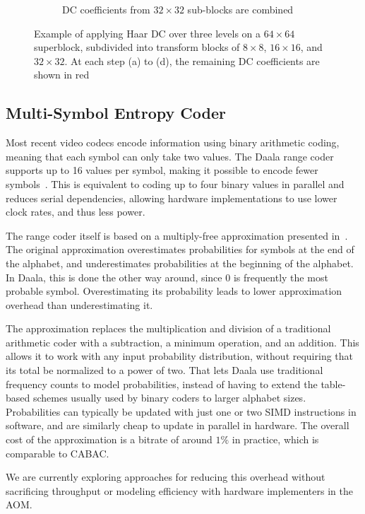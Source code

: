 \documentclass[english,conference,10pt]{IEEEtran}
\begin{document}
\begin{figure}
\begin{subfigure}[t]{0.49\columnwidth}
\caption{DC coefficients from $32\times 32$ sub-blocks are combined}
\end{subfigure}
\caption{Example of applying Haar DC over three levels on a $64\times 64$
superblock, subdivided into transform blocks of $8 \times 8$, $16 \times 16$,
and $32 \times 32$. At each step (a) to (d), the remaining DC coefficients
are shown in red\label{fig:haardc}}

\end{figure}

\subsection{Multi-Symbol Entropy Coder}
\label{sec:EntropyCoder}

Most recent video codecs encode information using binary arithmetic
coding, meaning that each symbol can only take two values. The Daala
range coder supports up to 16 values per symbol, making it possible
to encode fewer symbols~\cite{derfTools}. This is equivalent to
coding up to four binary values in parallel and reduces serial dependencies,
allowing hardware implementations to use lower clock rates, and thus less
power.

The range coder itself is based on a multiply-free approximation presented
in~\cite{stuiver1998piecewise}. The original approximation overestimates
probabilities for symbols at the end of the alphabet, and underestimates
probabilities at the beginning of the alphabet. In Daala, this is done the
other way around, since $0$ is frequently the most probable symbol.
Overestimating its probability leads to lower approximation overhead than
underestimating it.

The approximation replaces the multiplication and division of a traditional
arithmetic coder with a subtraction, a minimum operation, and an addition. This
allows it to work with any input probability distribution, without requiring
that its total be normalized to a power of two. That lets Daala use traditional
frequency counts to model probabilities, instead of having to extend the
table-based schemes usually used by binary coders to larger alphabet sizes.
Probabilities can typically be updated with just one or two SIMD instructions
in software, and are similarly cheap to update in parallel in hardware. The
overall cost of the approximation is a bitrate of around $1\%$ in practice,
which is comparable to CABAC\@.

We are currently exploring approaches for reducing this overhead without
sacrificing throughput or modeling efficiency with hardware implementers in the
AOM\@.
\end{document}
